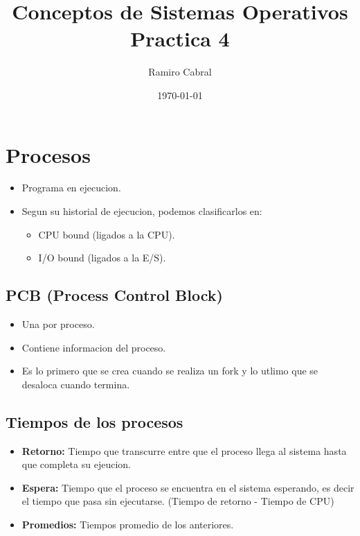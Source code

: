 \documentclass[11pt]{article}
\title{\Huge{Conceptos de Sistemas Operativos\\
Practica 4}}
\author{\huge{Ramiro Cabral}}
\date{\today}
\begin{document}
\maketitle
\tableofcontents
\pagebreak


\section{Procesos}
\begin{itemize}
    \item Programa en ejecucion.
    \item Segun su historial de ejecucion, podemos clasificarlos en:
        \begin{itemize}
            \item CPU bound (ligados a la CPU).
            \item I/O bound (ligados a la E/S).
        \end{itemize}
\end{itemize}

\subsection{PCB (Process Control Block)}
\begin{itemize}
    \item Una por proceso.
    \item Contiene informacion del proceso.
    \item Es lo primero que se crea cuando se realiza un fork y lo utlimo que se desaloca cuando termina.
\end{itemize}

\subsection{Tiempos de los procesos}
\begin{itemize}
    \item \textbf{Retorno:} Tiempo que transcurre entre que el proceso llega al sistema hasta que completa su ejeucion.
    \item \textbf{Espera:} Tiempo que el proceso se encuentra en el sistema esperando, es decir el tiempo que pasa sin ejecutarse. (Tiempo de retorno - Tiempo de CPU)
    \item \textbf{Promedios:} Tiempos promedio de los anteriores.
\end{itemize}
\end{document}
